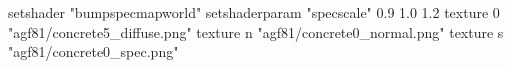 setshader "bumpspecmapworld"
setshaderparam "specscale" 0.9 1.0 1.2
   texture 0 "agf81/concrete5_diffuse.png"
   texture n "agf81/concrete0_normal.png"
   texture s "agf81/concrete0_spec.png"